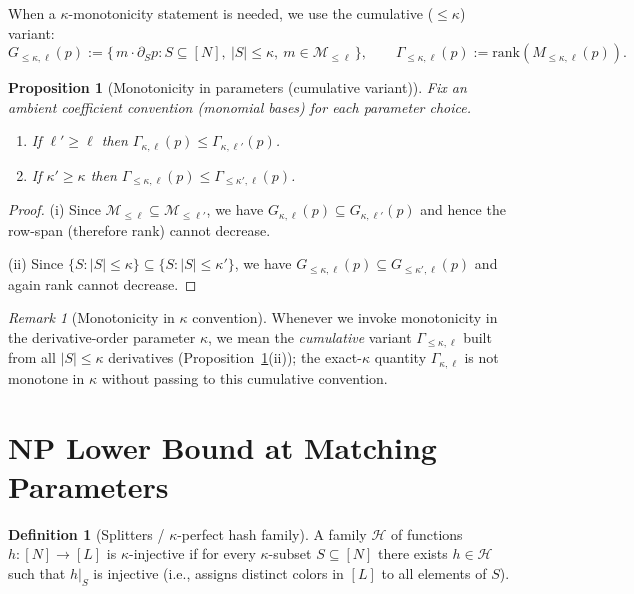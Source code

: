 \documentclass[12pt]{article}
\newtheorem{proposition}[theorem]{Proposition}
\theoremstyle{definition}
\newtheorem{definition}{Definition}
\theoremstyle{definition}
\theoremstyle{remark}
\newtheorem{remark}{Remark}
\theoremstyle{remark}
\begin{document}
When a $\kappa$-monotonicity statement is needed, we use the cumulative ($\le \kappa$) variant:
\[
G_{\le \kappa,\ell}(p) := \{\, m\cdot \partial_S p : S\subseteq[N],\ |S|\le \kappa,\ m\in\mathcal{M}_{\le \ell}\,\},
\qquad \Gamma_{\le \kappa,\ell}(p):=\mathrm{rank}(M_{\le \kappa,\ell}(p)).
\]

\begin{proposition}[Monotonicity in parameters (cumulative variant)]
\label{prop:monotonicity-parameters-cumulative}
Fix an ambient coefficient convention (monomial bases) for each parameter choice.
\begin{enumerate}[label=(\roman*)]
\item If $\ell'\ge \ell$ then $\Gamma_{\kappa,\ell}(p)\le \Gamma_{\kappa,\ell'}(p)$.
\item If $\kappa'\ge \kappa$ then $\Gamma_{\le \kappa,\ell}(p)\le \Gamma_{\le \kappa',\ell}(p)$.
\end{enumerate}
\end{proposition}

\begin{proof}
(i) Since $\mathcal{M}_{\le \ell}\subseteq \mathcal{M}_{\le \ell'}$, we have
$G_{\kappa,\ell}(p)\subseteq G_{\kappa,\ell'}(p)$ and hence the row-span (therefore rank)
cannot decrease.

(ii) Since $\{S:|S|\le \kappa\}\subseteq \{S:|S|\le \kappa'\}$, we have
$G_{\le \kappa,\ell}(p)\subseteq G_{\le \kappa',\ell}(p)$ and again rank cannot decrease.
\end{proof}

\begin{remark}[Monotonicity in $\kappa$ convention]
Whenever we invoke monotonicity in the derivative-order parameter $\kappa$, we mean the
\emph{cumulative} variant $\Gamma_{\le \kappa,\ell}$ built from all $|S|\le \kappa$ derivatives
(Proposition~\ref{prop:monotonicity-parameters-cumulative}(ii)); the exact-$\kappa$ quantity $\Gamma_{\kappa,\ell}$ is not monotone in $\kappa$
without passing to this cumulative convention.
\end{remark}


\section{NP Lower Bound at Matching Parameters}

\begin{definition}[Splitters / $\kappa$-perfect hash family]
A family $\mathcal H$ of functions $h:[N]\to[L]$ is $\kappa$-injective if for every
$\kappa$-subset $S\subseteq [N]$ there exists $h\in\mathcal H$ such that
$h|_{S}$ is injective (i.e., assigns distinct colors in $[L]$ to all elements of $S$).
\end{definition}
\end{document}
